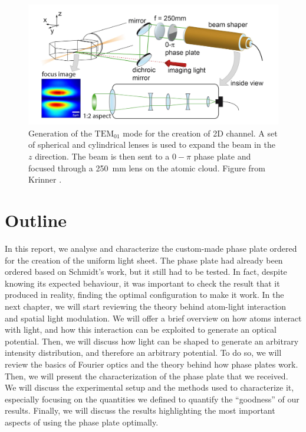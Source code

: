 \begin{figure}
    \includegraphics[width=\textwidth]{chapters/chapter_1/figures/beam_shaper.png}
    \caption[short]{Generation of the $\text{TEM}_{01}$ mode for the creation of 2D channel. A set of spherical and cylindrical lenses is used to expand the beam in the $z$ direction. The beam is then sent to a $0-\pi$ phase plate and focused through a \SI{250}{mm} lens on the atomic cloud. Figure from Krinner \cite{krinner2015b}.}
    \label{fig:beam_shaper}
\end{figure}

\section{Outline}
In this report, we analyse and characterize the custom-made phase plate ordered for the creation of the uniform light sheet. The phase plate had already been ordered based on Schmidt's work, but it still had to be tested. In fact, despite knowing its expected behaviour, it was important to check the result that it produced in reality, finding the optimal configuration to make it work.
In the next chapter, we will start reviewing the theory behind atom-light interaction and spatial light modulation. We will offer a brief overview on how atoms interact with light, and how this interaction can be exploited to generate an optical potential. Then, we will discuss how light can be shaped to generate an arbitrary intensity distribution, and therefore an arbitrary potential. To do so, we will review the basics of Fourier optics and the theory behind how phase plates work. Then, we will present the characterization of the phase plate that we received. We will discuss the experimental setup and the methods used to characterize it, especially focusing on the quantities we defined to quantify the \enquote{goodness} of our results. Finally, we will discuss the results highlighting the most important aspects of using the phase plate optimally.